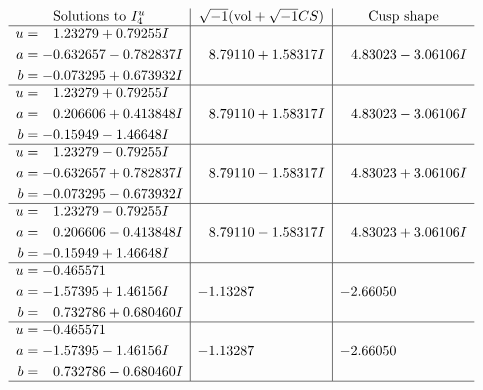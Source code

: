 \documentclass[1p]{elsarticle_modified}
\theoremstyle{definition}
\newcommand{\I}{\sqrt{-1}}
\begin{document}
$$\begin{array}{c|c|c}  
\text{Solutions to }I^u_{4}& \I (\text{vol} + \sqrt{-1}CS) & \text{Cusp shape}\\
 \hline 
\begin{aligned}
u &= \phantom{-}1.23279 + 0.79255 I \\
a &= -0.632657 - 0.782837 I \\
b &= -0.073295 + 0.673932 I\end{aligned}
 & \phantom{-}8.79110 + 1.58317 I & \phantom{-}4.83023 - 3.06106 I \\ \hline\begin{aligned}
u &= \phantom{-}1.23279 + 0.79255 I \\
a &= \phantom{-}0.206606 + 0.413848 I \\
b &= -0.15949 - 1.46648 I\end{aligned}
 & \phantom{-}8.79110 + 1.58317 I & \phantom{-}4.83023 - 3.06106 I \\ \hline\begin{aligned}
u &= \phantom{-}1.23279 - 0.79255 I \\
a &= -0.632657 + 0.782837 I \\
b &= -0.073295 - 0.673932 I\end{aligned}
 & \phantom{-}8.79110 - 1.58317 I & \phantom{-}4.83023 + 3.06106 I \\ \hline\begin{aligned}
u &= \phantom{-}1.23279 - 0.79255 I \\
a &= \phantom{-}0.206606 - 0.413848 I \\
b &= -0.15949 + 1.46648 I\end{aligned}
 & \phantom{-}8.79110 - 1.58317 I & \phantom{-}4.83023 + 3.06106 I \\ \hline\begin{aligned}
u &= -0.465571\phantom{ +0.000000I} \\
a &= -1.57395 + 1.46156 I \\
b &= \phantom{-}0.732786 + 0.680460 I\end{aligned}
 & -1.13287\phantom{ +0.000000I} & -2.66050\phantom{ +0.000000I} \\ \hline\begin{aligned}
u &= -0.465571\phantom{ +0.000000I} \\
a &= -1.57395 - 1.46156 I \\
b &= \phantom{-}0.732786 - 0.680460 I\end{aligned}
 & -1.13287\phantom{ +0.000000I} & -2.66050\phantom{ +0.000000I}\\
 \hline 
 \end{array}$$\newpage
\end{document}
